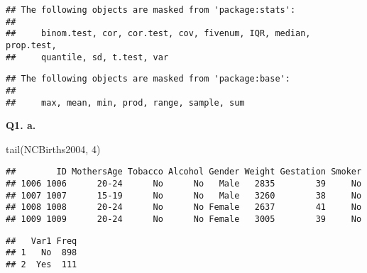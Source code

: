 \documentclass[
]{article}
\newenvironment{Shaded}{\begin{snugshade}}{\end{snugshade}}
\newcommand{\AttributeTok}[1]{\textcolor[rgb]{0.77,0.63,0.00}{#1}}
\newcommand{\CommentTok}[1]{\textcolor[rgb]{0.56,0.35,0.01}{\textit{#1}}}
\newcommand{\DecValTok}[1]{\textcolor[rgb]{0.00,0.00,0.81}{#1}}
\newcommand{\FunctionTok}[1]{\textcolor[rgb]{0.00,0.00,0.00}{#1}}
\newcommand{\NormalTok}[1]{#1}
\newcommand{\SpecialCharTok}[1]{\textcolor[rgb]{0.00,0.00,0.00}{#1}}
\begin{document}
\begin{verbatim}
## The following objects are masked from 'package:stats':
## 
##     binom.test, cor, cor.test, cov, fivenum, IQR, median, prop.test,
##     quantile, sd, t.test, var
\end{verbatim}

\begin{verbatim}
## The following objects are masked from 'package:base':
## 
##     max, mean, min, prod, range, sample, sum
\end{verbatim}

\textbf{Q1. a.}

\begin{Shaded}
\begin{Highlighting}[]
\FunctionTok{tail}\NormalTok{(NCBirths2004, }\DecValTok{4}\NormalTok{)}
\end{Highlighting}
\end{Shaded}

\begin{verbatim}
##        ID MothersAge Tobacco Alcohol Gender Weight Gestation Smoker
## 1006 1006      20-24      No      No   Male   2835        39     No
## 1007 1007      15-19      No      No   Male   3260        38     No
## 1008 1008      20-24      No      No Female   2637        41     No
## 1009 1009      20-24      No      No Female   3005        39     No
\end{verbatim}

\begin{Shaded}
\end{Shaded}

\begin{verbatim}
##   Var1 Freq
## 1   No  898
## 2  Yes  111
\end{verbatim}

\begin{Shaded}
\end{Shaded}
\end{document}

